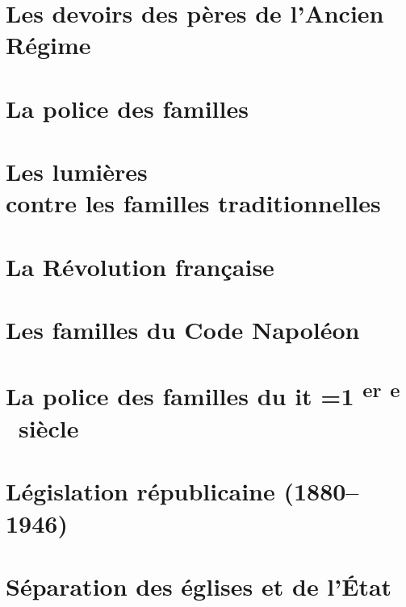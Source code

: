 \documentclass[12pt,french]{book}
\makeatletter
\newcommand*{\my@test@it}{it}
\newcommand*{\crm}[1]{%
\ifx\f@shape\my@test@it%
  \textsc{\textsl{\romannumeral #1}}\relax
\else%
  \textsc{\romannumeral #1}\relax
\fi}
\newcommand*{\crmieme}[1]{%
\crm{#1}%
\ifnum#1=1%
  \ifdefined\ier%
    \ier%
  \else%
    \textsuperscript{\lowercase{er}}%
  \fi%
\else%
  \ifdefined\ieme%
    \ieme%
  \else%
    \textsuperscript{\lowercase{e}}%
  \fi%
\fi%
}
\newcommand*{\siecle}[1]{%
\crmieme{#1}\ siècle%
}
\makeatother
\begin{document}
\chapter{Les devoirs des pères de l'Ancien Régime}


\chapter{La police des familles}


\chapter[Les lumières contre les familles traditionnelles]{Les lumières\\contre les familles traditionnelles}


\chapter{La Révolution française}


\chapter{Les familles du Code Napoléon}


\chapter{La police des familles du \siecle{19}}


\chapter{Législation républicaine (1880--1946)}


\chapter{Séparation des églises et de l'État}

\end{document}
